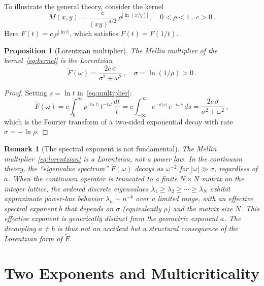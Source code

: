 \documentclass[12pt]{article}
\newtheorem{proposition}[theorem]{Proposition}
\newtheorem{remark}[theorem]{Remark}
\begin{document}
To illustrate the general theory, consider the kernel
\begin{equation}\label{eq:kernel}
M(x,y) = \frac{c}{(xy)^{a/2}}\, \rho^{|\ln(x/y)|}\,, \quad 0 < \rho < 1\,,\; c > 0\,.
\end{equation}
Here $F(t) = c\,\rho^{|\ln t|}$, which satisfies $F(t) = F(1/t)$.

\begin{proposition}[Lorentzian multiplier]\label{prop:lorentzian}
The Mellin multiplier of the kernel~\eqref{eq:kernel} is the Lorentzian
\begin{equation}\label{eq:lorentzian}
\widetilde{F}(\omega) = \frac{2c\,\sigma}{\sigma^2 + \omega^2}\,, \quad \sigma = \ln(1/\rho) > 0\,.
\end{equation}
\end{proposition}

\begin{proof}
Setting $s = \ln t$ in~\eqref{eq:multiplier}:
\[
\widetilde{F}(\omega) = c\int_0^\infty \rho^{|\ln t|}\, t^{-i\omega}\, \frac{dt}{t} = c\int_{-\infty}^\infty e^{-\sigma|s|}\, e^{-i\omega s}\, ds = \frac{2c\,\sigma}{\sigma^2 + \omega^2}\,,
\]
which is the Fourier transform of a two-sided exponential decay with rate $\sigma = -\ln\rho$.
\end{proof}

\begin{remark}[The spectral exponent is not fundamental]\label{rem:notpower}
The Mellin multiplier~\eqref{eq:lorentzian} is a Lorentzian, not a power law. In the continuum theory, the ``eigenvalue spectrum'' $\widetilde{F}(\omega)$ decays as $\omega^{-2}$ for $|\omega| \gg \sigma$, regardless of $a$. When the continuum operator is truncated to a finite $N \times N$ matrix on the integer lattice, the ordered discrete eigenvalues $\lambda_1 \geq \lambda_2 \geq \cdots \geq \lambda_N$ exhibit approximate power-law behavior $\lambda_n \sim n^{-b}$ over a limited range, with an effective spectral exponent $b$ that depends on $\sigma$ (equivalently $\rho$) and the matrix size $N$. This effective exponent is generically distinct from the geometric exponent $a$. The decoupling $a \neq b$ is thus not an accident but a structural consequence of the Lorentzian form of $\widetilde{F}$.
\end{remark}


\section{Two Exponents and Multicriticality}\label{sec:multicrit}
\end{document}
